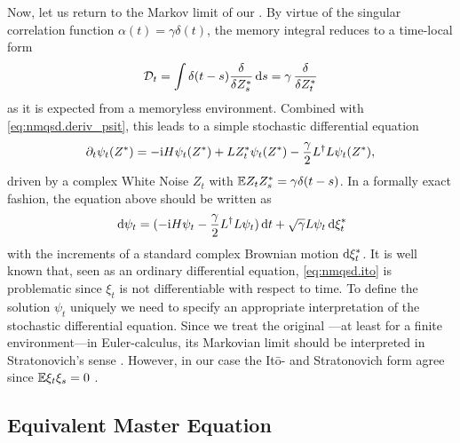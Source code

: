 Now, let us return to the Markov limit of our {\NMSSE}.
By virtue of the singular correlation function $\alpha(t) = \gamma\delta(t)$, the memory integral reduces to a time-local form
\begin{equation*}
  \mathcal{D}_t = \int \delta(t - s) \frac{\delta}{\delta {Z}^*_s}\, \mathrm{d} s = \gamma \, \frac{\delta}{\delta {Z}^*_t}
\end{equation*}
as it is expected from a memoryless environment.
Combined with \autoref{eq:nmqsd.deriv_psit}, this leads to a simple stochastic differential equation
\begin{equation}
  \partial_t \psi_t({Z}^*) = -\mathrm{i} H \psi_t({Z}^*) + L{Z}^*_t\psi_t({Z}^*) - \frac{\gamma}{2}L^\dagger L\psi_t({Z}^*),
  \label{eq:nmqsd.markov}
\end{equation}
driven by a complex White Noise $Z_t$ with $\E{Z_t \ZZ_s} = \gamma\delta(t-s)$.
In a formally exact fashion, the equation above should be written as
\begin{equation}
  \, \mathrm{d}\psi_t = (-\mathrm{i}H\psi_t - \frac{\gamma}{2} L^\dagger L \psi_t) \, \mathrm{d} t + \sqrt{\gamma} L\psi_t \, \mathrm{d} {\xi}^*_t
  \label{eq:nmqsd.ito}
\end{equation}
with the increments of a standard complex Brownian motion $\mathrm{d}{\xi}^*_t$.
It is well known that, seen as an ordinary differential equation, \autoref{eq:nmqsd.ito} is problematic since $\xi_t$ is not differentiable with respect to time.
To define the solution $\psi_t$ uniquely we need to specify an appropriate interpretation of the stochastic differential equation.
Since we treat the original \NMSSE---at least for a finite environment---in Euler-calculus, its Markovian limit should be interpreted in Stratonovich's sense \cite{Ok03_sde}.
However, in our case the It\=o- and Stratonovich form agree since $\E \xi_t \xi_s = 0$ \cite{GaCr85_handbook}.

\subsection{Equivalent Master Equation}
\label{sub:nmqsd.lin_nmsse.master}

